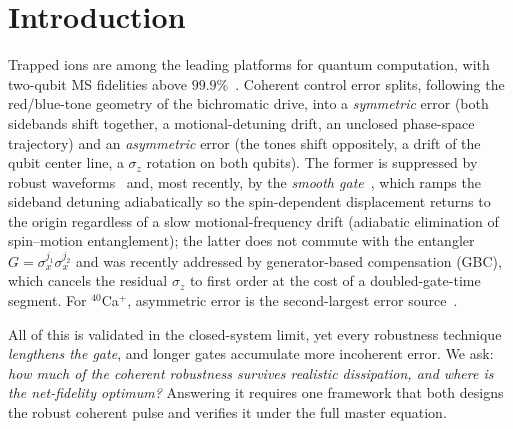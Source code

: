 \documentclass[aps,prapplied,twocolumn,superscriptaddress,floatfix,nofootinbib]{revtex4-2}
\begin{document}
\begin{abstract}
(vi)~we bring the recent \emph{smooth gate} (adiabatic elimination of spin--motion entanglement,
AESE~\cite{Hughes25}) into the same open-system framework as a second, orthogonal robustness axis:
AESE crushes the symmetric (motional/temperature) axis (spin--motion residual suppressed
$\sim\!800\times$, motional-noise filter $\sim\!10^{6}\times$ below the diabatic gate) while GBC
crushes the asymmetric axis, so their infidelities add. Because the smooth gate is intrinsically
long ($\tau_{\rm smooth}\!\approx\!14\tau$), it is symmetric-robust but asymmetric-fragile; a
four-scheme (plain/smooth/GBC/smooth+GBC) decision map shows smooth+GBC wins only where both error
axes are large, with an add-GBC-to-smooth threshold $\Delta\omega^\times\!\approx\!3.5\times10^{-3}$.
\end{abstract}

\maketitle

\section{Introduction}
Trapped ions are among the leading platforms for quantum computation, with two-qubit MS
fidelities above $99.9\%$~\cite{Ballance16,Gaebler16,Clark21}. Coherent control error
splits, following the red/blue-tone geometry of the bichromatic drive, into a
\emph{symmetric} error (both sidebands shift together, a motional-detuning drift, an
unclosed phase-space trajectory) and an \emph{asymmetric} error (the tones shift
oppositely, a drift of the qubit center line, a $\sigma_z$ rotation on both qubits). The
former is suppressed by robust waveforms~\cite{Leung18,Milne20,Roos08,Zhu06} and, most recently,
by the \emph{smooth gate}~\cite{Hughes25}, which ramps the sideband detuning adiabatically so the
spin-dependent displacement returns to the origin regardless of a slow motional-frequency drift
(adiabatic elimination of spin--motion entanglement); the latter
does not commute with the entangler $G=\sigma_x^{j_1}\sigma_x^{j_2}$ and was recently
addressed by generator-based compensation (GBC), which cancels the residual $\sigma_z$ to
first order at the cost of a doubled-gate-time segment. For ${}^{40}$Ca$^+$, asymmetric
error is the second-largest error source~\cite{Pogorelov21,Postler22}.

All of this is validated in the closed-system limit, yet every robustness technique
\emph{lengthens the gate}, and longer gates accumulate more incoherent error. We ask:
\emph{how much of the coherent robustness survives realistic dissipation, and where is
the net-fidelity optimum?} Answering it requires one framework that both designs the
robust coherent pulse and verifies it under the full master equation.
\end{document}
